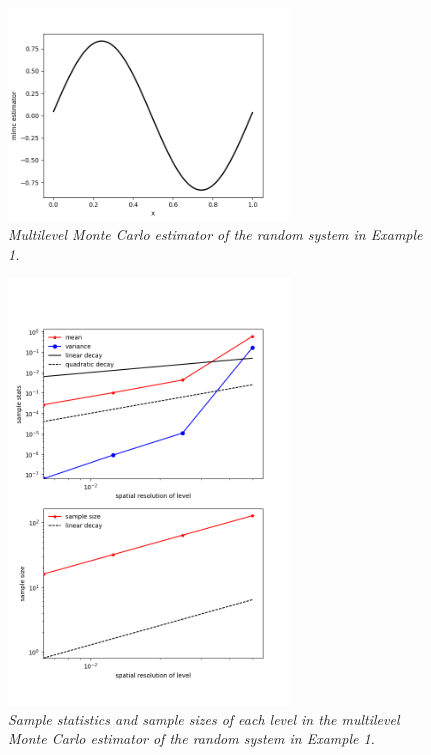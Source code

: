 \documentclass[10pt,letterpaper,extrafontsizes]{memoir}
\begin{document}
\newpage 
\begin{figure}
  \centering
  \includegraphics[width=75mm]{mlmc_mean_interp_uq}
  \caption{\textit{Multilevel Monte Carlo estimator of the random system in Example 1.}}
\end{figure}
\begin{figure}
  \centering
  \includegraphics[width=75mm]{sample_stats_interp_uq}
  \caption{\textit{Sample statistics and sample sizes of each level in the multilevel Monte Carlo estimator of the random system in Example 1.}}
\end{figure}



\end{document}
